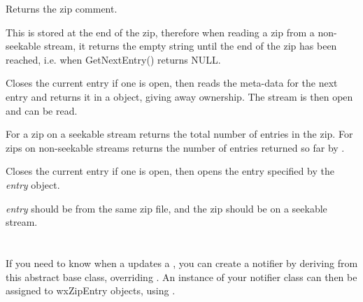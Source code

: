 \label{wxzipinputstreamgetcomment}


Returns the zip comment.

This is stored at the end of the zip, therefore when reading a zip
from a non-seekable stream, it returns the empty string until the
end of the zip has been reached, i.e. when GetNextEntry() returns
NULL.


\label{wxzipinputstreamgetnextentry}


Closes the current entry if one is open, then reads the meta-data for
the next entry and returns it in a 
object, giving away ownership. The stream is then open and can be read.


\label{wxzipinputstreamgettotalentries}


For a zip on a seekable stream returns the total number of entries in
the zip. For zips on non-seekable streams returns the number of entries
returned so far by .


\label{wxzipinputstreamopenentry}


Closes the current entry if one is open, then opens the entry specified
by the {\it entry} object.

{\it entry} should be from the same zip file, and the zip should
be on a seekable stream.




%
%

\section{}\label{wxzipnotifier}

If you need to know when a 
updates a ,
you can create a notifier by deriving from this abstract base class,
overriding .
An instance of your notifier class can then be assigned to wxZipEntry
objects, using .

